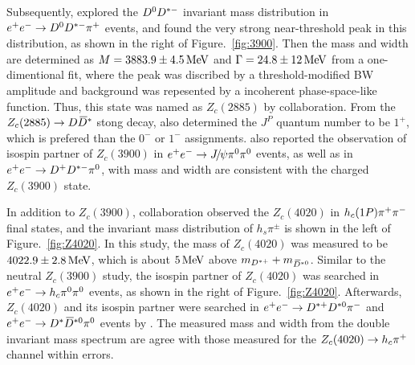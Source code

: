 Subsequently,
\besiii explored the ${{D}^0}{{D}^{*-}}$ invariant mass distribution in ${e^+}{e^-}\rightarrow{\ensuremath{{D}^0}}{\ensuremath{{D}^{*-}}}{\ensuremath{{\pi}^+}}$ events,
and found the very strong near-threshold peak in this distribution,
as shown in the right of Figure.~\ref{fig:3900}.
Then the mass and width are determined as $M=3883.9\pm4.5 \text{\,Me\kern -0.1em V}$ and $\Gamma=24.8\pm12 \text{\,Me\kern -0.1em V}$ from a one-dimentional fit,
where the peak was discribed by a threshold-modified BW amplitude 
and background was repesented by a incoherent phase-space-like function\supercite{PhysRevLett.112.022001}.
Thus, 
this state was named as $Z_{c}(2885)$ by \besiii collaboration.
From the $Z_{c}(2885)\rightarrow{\ensuremath{D}}{\ensuremath{{\kern 0.18em\overline{\kern -0.18em D}}{}^*}}$ stong decay,
\besiii also determined the $J^{P}$ quantum number to be $1^{+}$,
which is prefered than the $0^{-}$ or $1^{-}$ assignments.
\besiii also reported the observation of isospin partner of $Z_c(3900)$ in ${e^+}{e^-}\rightarrow{\ensuremath{{J\mskip -3mu/\mskip -2mu\psi}}}{\ensuremath{{\pi}^0}}{\ensuremath{{\pi}^0}}$ events\supercite{PhysRevLett.115.112003},
as well as in ${e^+}{e^-}\rightarrow{\ensuremath{{D}^+}}{\ensuremath{{D}^{*-}}}{\ensuremath{{\pi}^0}}$\supercite{PhysRevLett.112.022001},
with mass and width are consistent with the charged $Z_{c}(3900)$ state.


In addition to $Z_c(3900)$,
\besiii collaboration observed the $Z_c(4020)$ in $h_c(1P){{\pi}^+}{{\pi}^-}$ final states\supercite{PhysRevLett.111.242001},
and the invariant mass distribution of $h_{s}\pi^{\pm}$ is shown in the left of Figure.~\ref{fig:Z4020}.
In this study,
the mass of $Z_c(4020)$ was measured to be $4022.9\pm2.8 \text{\,Me\kern -0.1em V}$,
which is about $5 \text{\,Me\kern -0.1em V}$ above $m_{{{D}^{*+}}}+m_{{{\kern 0.18em\overline{\kern -0.18em D}}{}^{*0}}}$.
Similar to the neutral $Z_c(3900)$ study,
the isospin partner of $Z_c(4020)$ was searched in ${e^+}{e^-}\rightarrow h_{c}{{\pi}^0}{{\pi}^0}$ events\supercite{PhysRevLett.113.212002},
as shown in the right of Figure.~\ref{fig:Z4020}.
Afterwards,
$Z_c(4020)$ and its isospin partner were searched in ${e^+}{e^-}\rightarrow{\ensuremath{{D}^{*+}}}{\ensuremath{{D}^{*0}}}{\ensuremath{{\pi}^-}}$\supercite{PhysRevLett.112.132001} 
and ${e^+}{e^-}\rightarrow{\ensuremath{{D}^*}}{\ensuremath{{\kern 0.18em\overline{\kern -0.18em D}}{}^{*0}}}{\ensuremath{{\pi}^0}}$\supercite{PhysRevLett.115.182002} events by \besiii. 
The measured mass and width from the double \D invariant mass spectrum are agree with those measured 
for the $Z_c(4020)\rightarrow h_{c}{{\pi}^+}$ channel within errors.


